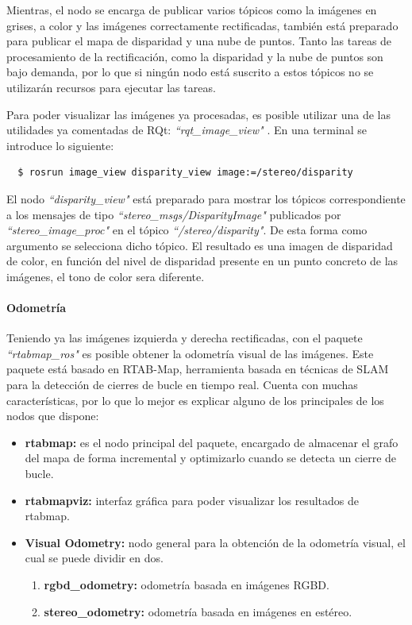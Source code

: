 Mientras, el nodo se encarga de publicar varios tópicos como la imágenes en
grises, a color y las imágenes correctamente rectificadas, también está
preparado para publicar el mapa de disparidad y una nube de puntos. Tanto las
tareas de procesamiento de la rectificación, como la disparidad y la nube de
puntos son bajo demanda, por lo que si ningún nodo está suscrito a estos tópicos
no se utilizarán recursos para ejecutar las tareas.

Para poder visualizar las imágenes ya procesadas, es posible utilizar una de las
utilidades ya comentadas de RQt: \textit{``rqt\_image\_view"}
\cite{PackageRqtImageView}. En una terminal se introduce lo siguiente:
\\
\begin{lstlisting}
  $ rosrun image_view disparity_view image:=/stereo/disparity
\end{lstlisting}

El nodo \textit{``disparity\_view"} está preparado para mostrar los tópicos
correspondiente a los mensajes de tipo \textit{``stereo\_msgs/DisparityImage"}
publicados por \textit{``stereo\_image\_proc"} en el tópico
\textit{``/stereo/disparity"}. De esta forma como argumento se selecciona dicho
tópico. El resultado es una imagen de disparidad de color, en función del nivel
de disparidad presente en un punto concreto de las imágenes, el tono de color
sera diferente.

\paragraph{Odometría} \hspace{0pt}

Teniendo ya las imágenes izquierda y derecha rectificadas, con el paquete
\textit{``rtabmap\_ros"} \cite{PackageRtabmapRos}es posible obtener la odometría
visual de las imágenes. Este paquete está basado en RTAB-Map, herramienta basada
en técnicas de SLAM para la detección de cierres de bucle en tiempo real. Cuenta
con muchas características, por lo que lo mejor es explicar alguno de los
principales de los nodos que dispone:

\begin{itemize}
  \item \textbf{rtabmap:} es el nodo principal del paquete, encargado de
  almacenar el grafo del mapa de forma incremental y optimizarlo cuando se
  detecta un cierre de bucle.
  \item \textbf{rtabmapviz:} interfaz gráfica para poder visualizar los
  resultados de rtabmap.
  \item \textbf{Visual Odometry:} nodo general para la obtención de la odometría
  visual, el cual se puede dividir en dos.
  \begin{enumerate}
    \item \textbf{rgbd\_odometry:} odometría basada en imágenes RGBD.
    \item \textbf{stereo\_odometry:} odometría basada en imágenes en estéreo.
  \end{enumerate}
\end{itemize}

